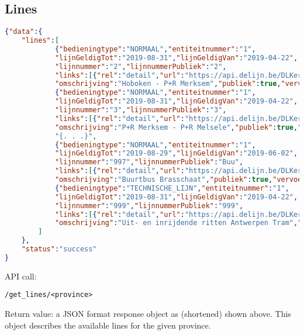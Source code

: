 \documentclass[12pt]{article}
\begin{document}
\subsection{Lines}
\begin{lstlisting}[language=json]
{"data":{
	"lines":[
			{"bedieningtype":"NORMAAL","entiteitnummer":"1",
			"lijnGeldigTot":"2019-08-31","lijnGeldigVan":"2019-04-22",
			"lijnnummer":"2","lijnnummerPubliek":"2",
			"links":[{"rel":"detail","url":"https://api.delijn.be/DLKernOpenData/v1/beta/lijnen/1/2"}],
			"omschrijving":"Hoboken - P+R Merksem","publiek":true,"vervoertype":"TRAM"},
			{"bedieningtype":"NORMAAL","entiteitnummer":"1",
			"lijnGeldigTot":"2019-08-31","lijnGeldigVan":"2019-04-22",
			"lijnnummer":"3","lijnnummerPubliek":"3",
			"links":[{"rel":"detail","url":"https://api.delijn.be/DLKernOpenData/v1/beta/lijnen/1/3"}],
			"omschrijving":"P+R Merksem - P+R Melsele","publiek":true,"vervoertype":"TRAM"},
			"{. . .}",
			{"bedieningtype":"NORMAAL","entiteitnummer":"1",
			"lijnGeldigTot":"2019-08-29","lijnGeldigVan":"2019-06-02",
			"lijnnummer":"997","lijnnummerPubliek":"Buu",
			"links":[{"rel":"detail","url":"https://api.delijn.be/DLKernOpenData/v1/beta/lijnen/1/997"}],
			"omschrijving":"Buurtbus Brasschaat","publiek":true,"vervoertype":"BUS"},
			{"bedieningtype":"TECHNISCHE_LIJN","entiteitnummer":"1",
			"lijnGeldigTot":"2019-08-31","lijnGeldigVan":"2019-04-22",
			"lijnnummer":"999","lijnnummerPubliek":"999",
			"links":[{"rel":"detail","url":"https://api.delijn.be/DLKernOpenData/v1/beta/lijnen/1/999"}],
			"omschrijving":"Uit- en inrijdende ritten Antwerpen Tram","publiek":false,"vervoertype":"BUS"}
		]
	},
	"status":"success"
}
\end{lstlisting}
API call:
\begin{lstlisting}[style=DOS]
/get_lines/<province>
\end{lstlisting}
Return value: a JSON format response object as (shortened) shown above. This object describes the available lines for the given province.
\newpage
\end{document}
